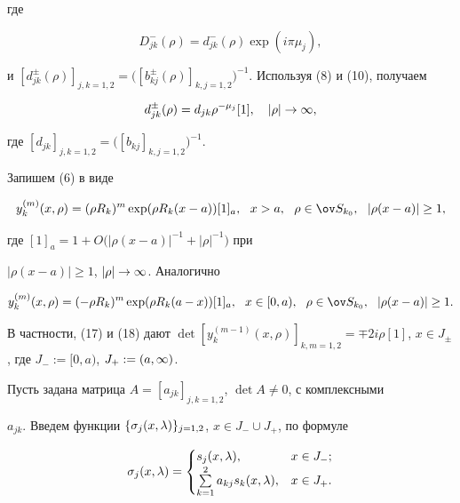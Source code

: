 где


\begin{equation}


D_{jk}^{-}(\rho)=d_{jk}^{-}(\rho)\exp(i\pi\mu_j),


\end{equation}


и $[d_{jk}^{\pm}(\rho)]_{j,k=1,2}=\big([b_{kj}^{\pm}(\rho)]_{k,j=1,2}


\big)^{-1}$. Используя (8) и (10), получаем


\begin{equation}


d_{jk}^{\pm}(\rho)=d_{jk}\rho^{-\mu_j}[1],\quad |\rho|\to\iy,


\end{equation}


где $[d_{jk}]_{j,k=1,2}=\big([b_{kj}]_{k,j=1,2}\big)^{-1}$.


Запишем (6) в виде


\begin{equation}


y_k^{(m)}(x,\rho)=(\rho R_k)^{m}\exp(\rho R_k(x-a))[1]_a,\ \


x>a,\ \ \rho\in\ov S_{k_0},\ \ |\rho(x-a)|\ge 1,


\end{equation}


где $[1]_a=1+O\big(|\rho(x-a)|^{-1}+|\rho|^{-1}\big)$ при


$|\rho(x-a)|\ge 1$, $|\rho|\to\infty$. Аналогично


\begin{equation}


y_k^{(m)}(x,\rho)=(-\rho R_k)^{m}\exp(\rho R_k(a-x))[1]_a,


\ \ x\in[0,a),\ \ \rho\in\ov S_{k_0},\ \ |\rho(x-a)|\ge 1.


\end{equation}


В частности, (17) и (18) дают $\det[y_k^{(m-1)}(x,\rho)]_{k,m=1,2}=


\mp 2i\rho[1]$, $x\in J_{\pm}$, где $J_{-}:=[0,a)$, $J_{+}:=(a,\iy)$.





Пусть задана матрица $A=[a_{jk}]_{j,k=1,2}$, $\det A\ne 0$, с комплексными


$a_{jk}$. Введем функции $\{\sigma_j(x,\la)\}_{j=1,2}$, $x\in J_{-}\cup


J_{+}$, по формуле


\begin{equation}


\sigma_j(x,\la)=


\begin{cases}


s_j(x,\la), & x\in J_{-};\\


\sum\limits_{k=1}^{2}a_{kj}s_k(x,\la), & x\in J_{+}.


\end{cases}


\end{equation}


